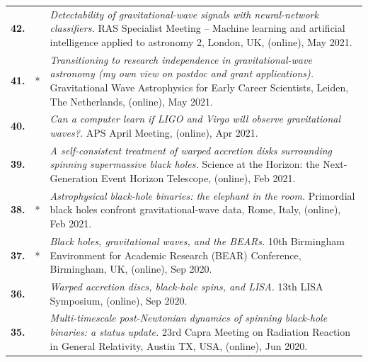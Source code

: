 {\begin{longtable}{rp{0.3cm}p{15.8cm}}
%
\textbf{42.} &  & \textit{Detectability of gravitational-wave signals with neural-network classifiers.}
\newline{}
RAS Specialist Meeting -- Machine learning and artificial intelligence applied to astronomy 2, London, UK, (online), May 2021.
\vspace{0.05cm}\\
%
\textbf{41.} & * & \textit{Transitioning to research independence in gravitational-wave astronomy (my own view on postdoc and grant applications).}
\newline{}
Gravitational Wave Astrophysics for Early Career Scientists, Leiden, The Netherlands, (online), May 2021.
\vspace{0.05cm}\\
%
\textbf{40.} &  & \textit{Can a computer learn if LIGO and Virgo will observe gravitational waves?.}
\newline{}
APS April Meeting, (online), Apr 2021.
\vspace{0.05cm}\\
%
\textbf{39.} &  & \textit{A self-consistent treatment of warped accretion disks surrounding spinning supermassive black holes.}
\newline{}
Science at the Horizon: the Next-Generation Event Horizon Telescope, (online), Feb 2021.
\vspace{0.05cm}\\
%
\textbf{38.} & * & \textit{Astrophysical black-hole binaries: the elephant in the room.}
\newline{}
Primordial black holes confront gravitational-wave data, Rome, Italy, (online), Feb 2021.
\vspace{0.05cm}\\
%
\textbf{37.} & * & \textit{Black holes, gravitational waves, and the BEARs.}
\newline{}
10th Birmingham Environment for Academic Research (BEAR) Conference, Birmingham, UK, (online), Sep 2020.
\vspace{0.05cm}\\
%
\textbf{36.} &  & \textit{Warped accretion discs, black-hole spins, and LISA.}
\newline{}
13th LISA Symposium, (online), Sep 2020.
\vspace{0.05cm}\\
%
\textbf{35.} &  & \textit{Multi-timescale post-Newtonian dynamics of spinning black-hole binaries: a status update.}
\newline{}
23rd Capra Meeting on Radiation Reaction in General Relativity, Austin TX, USA, (online), Jun 2020.

\end{longtable}}
